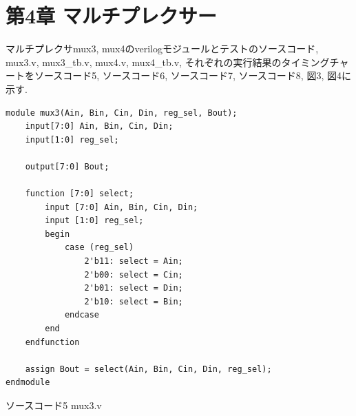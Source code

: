 \documentclass[12pt]{jreport}
\begin{document}
    \chapter*{第4章 マルチプレクサー}
        マルチプレクサmux3, mux4のverilogモジュールとテストのソースコード, mux3.v, mux3\_tb.v, mux4.v, mux4\_tb.v, それぞれの実行結果のタイミングチャートをソースコード5, ソースコード6, ソースコード7, ソースコード8, 図3, 図4に示す. 
        \begin{center}
            \begin{lstlisting}[basicstyle=\ttfamily\footnotesize, frame=single]
module mux3(Ain, Bin, Cin, Din, reg_sel, Bout);
    input[7:0] Ain, Bin, Cin, Din;
    input[1:0] reg_sel;

    output[7:0] Bout;
    
    function [7:0] select;
        input [7:0] Ain, Bin, Cin, Din;
        input [1:0] reg_sel;
        begin
            case (reg_sel)
                2'b11: select = Ain;
                2'b00: select = Cin;
                2'b01: select = Din;
                2'b10: select = Bin;
            endcase
        end
    endfunction

    assign Bout = select(Ain, Bin, Cin, Din, reg_sel);
endmodule
            \end{lstlisting}
            ソースコード5 mux3.v
        \end{center}
\end{document}
